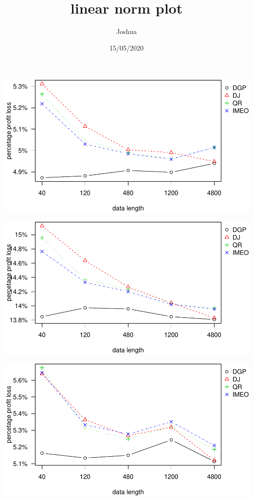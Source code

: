 \documentclass[
]{article}
\title{linear norm plot}
\author{Joshua}
\date{15/05/2020}
\begin{document}
\maketitle

\includegraphics{linear-norm-plot_files/figure-latex/ppl0.5-1.pdf}

\includegraphics{linear-norm-plot_files/figure-latex/ppl0.63-1.pdf}

\includegraphics{linear-norm-plot_files/figure-latex/ppl0.3-1.pdf}
\end{document}
